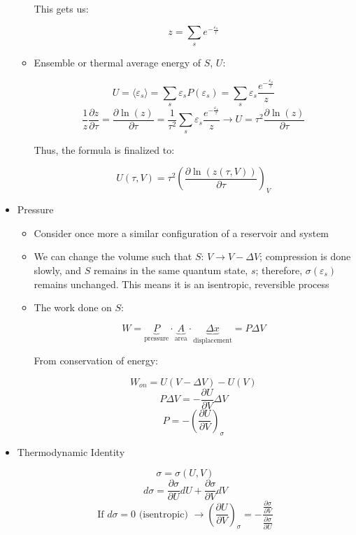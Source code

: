 \begin{itemize}
\begin{itemize}
        This gets us:

        $$\boxed{z=\sum_se^{-\frac{\varepsilon_s}{\tau}}}$$

      \item Ensemble or thermal average energy of $S$, $U$:

        $$U=\langle \varepsilon_s\rangle=\sum_s\varepsilon_sP(\varepsilon_s)=\sum_s \varepsilon_s\frac{e^{-\frac{\varepsilon_s}{\tau}}}{z}$$
        $$\frac{1}{z}\frac{\partial z}{\partial \tau}=\frac{\partial \ln(z)}{\partial \tau}=\frac{1}{\tau^2}\sum_s\varepsilon_s\frac{e^{-\frac{\varepsilon_s}{\tau}}}{z}\rightarrow U=\tau^2\frac{\partial \ln(z)}{\partial \tau}$$

        Thus, the formula is finalized to:

        $$\boxed{U(\tau, V)=\tau^2\left( \frac{\partial \ln(z(\tau,V))}{\partial \tau} \right)_V}$$

    \end{itemize}
    
  \item Pressure

    \begin{itemize}

      \item Consider once more a similar configuration of a reservoir and system

      \item We can change the volume such that $S:\, V\to V-\Delta V$; compression is done slowly, and $S$ remains in the same quantum state, $s$; therefore, $\sigma(\varepsilon_s)$ remains unchanged. This means it is an isentropic, reversible process

      \item The work done on $S$:

        $$W=\underbrace{P}_{\text{pressure}}\cdot \underbrace{A}_{\text{area}}\cdot \underbrace{\Delta x}_{\text{displacement}}=P\Delta V$$

        From conservation of energy:

        $$W_{on}=U(V-\Delta V)-U(V)$$
        $$P\Delta V=-\frac{\partial U}{\partial V}\Delta V$$
        $$P=-\left( \frac{\partial U}{\partial V} \right)_{\sigma}$$

    \end{itemize}

  \item Thermodynamic Identity

    $$\sigma=\sigma(U,V)$$
    $$d\sigma=\frac{\partial \sigma}{\partial U}dU+\frac{\partial \sigma}{\partial V}dV$$
    $$\text{If }d\sigma=0\text{ (isentropic) }\to\left(\frac{\partial U}{\partial V}\right)_{\sigma}=-\frac{\frac{\partial \sigma}{\partial V}}{\frac{\partial \sigma}{\partial U}}$$

\end{itemize}



